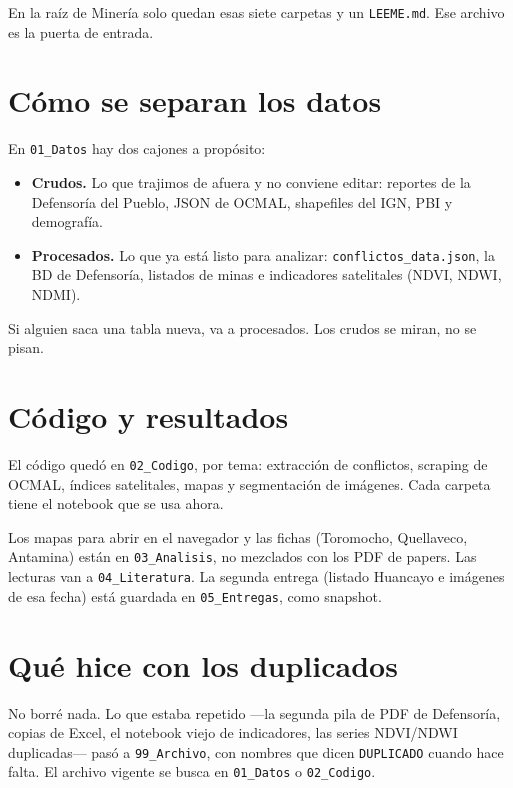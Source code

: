 \documentclass[11pt,a4paper]{article}
\begin{document}
\vspace{0.6em}
En la raíz de Minería solo quedan esas siete carpetas y un \texttt{LEEME.md}. Ese archivo es la puerta de entrada.

\section{Cómo se separan los datos}

En \texttt{01\_Datos} hay dos cajones a propósito:

\begin{itemize}
  \item \textbf{Crudos.} Lo que trajimos de afuera y no conviene editar: reportes de la Defensoría del Pueblo, JSON de OCMAL, shapefiles del IGN, PBI y demografía.
  \item \textbf{Procesados.} Lo que ya está listo para analizar: \texttt{conflictos\_data.json}, la BD de Defensoría, listados de minas e indicadores satelitales (NDVI, NDWI, NDMI).
\end{itemize}

Si alguien saca una tabla nueva, va a procesados. Los crudos se miran, no se pisan.

\section{Código y resultados}

El código quedó en \texttt{02\_Codigo}, por tema: extracción de conflictos, scraping de OCMAL, índices satelitales, mapas y segmentación de imágenes. Cada carpeta tiene el notebook que se usa ahora.

Los mapas para abrir en el navegador y las fichas (Toromocho, Quellaveco, Antamina) están en \texttt{03\_Analisis}, no mezclados con los PDF de papers. Las lecturas van a \texttt{04\_Literatura}. La segunda entrega (listado Huancayo e imágenes de esa fecha) está guardada en \texttt{05\_Entregas}, como snapshot.

\section{Qué hice con los duplicados}

No borré nada. Lo que estaba repetido ---la segunda pila de PDF de Defensoría, copias de Excel, el notebook viejo de indicadores, las series NDVI/NDWI duplicadas--- pasó a \texttt{99\_Archivo}, con nombres que dicen \texttt{DUPLICADO} cuando hace falta. El archivo vigente se busca en \texttt{01\_Datos} o \texttt{02\_Codigo}.
\end{document}
